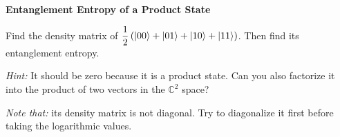 \documentclass[a4paper, 10pt]{article}
\begin{document}
\newpage

\begin{problem}
\textbf{Entanglement Entropy of a Product State}
\par Find the density matrix of \( \displaystyle \frac{1}{2} \left(\ket{00} + \ket{01} + \ket{10} + \ket{11}\right) \).
Then find its entanglement entropy.
\par \textit{Hint:} It should be zero because it is a product state.
Can you also factorize it into the product of two vectors in the \( \mathbb{C}^2 \) space?
\par \textit{Note that:} its density matrix is not diagonal.
Try to diagonalize it first before taking the logarithmic values.
\end{problem}
\end{document}
